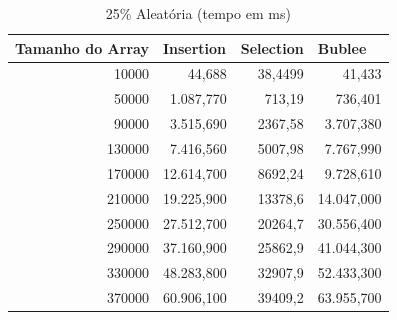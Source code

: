 \documentclass[a4paper, 12pt]{article}
\begin{document}
\begin{longtable}[c]{rrrr}
	\caption{25\% Aleatória (tempo em ms)}
	\label{tab:aleatoria251-table}\\
	\hline
	\multicolumn{1}{l}{\textbf{Tamanho do Array}} & \multicolumn{1}{l}{\textbf{Insertion}} & \multicolumn{1}{l}{\textbf{Selection}} & \multicolumn{1}{l}{\textbf{Bublee}} \\ \hline
	\endfirsthead
	\endhead
	\multicolumn{1}{|r|}{10000}                   & \multicolumn{1}{r|}{44,688}            & \multicolumn{1}{r|}{38,4499}           & \multicolumn{1}{r|}{41,433}         \\ \hline
	\multicolumn{1}{|r|}{50000}                   & \multicolumn{1}{r|}{1.087,770}         & \multicolumn{1}{r|}{713,19}            & \multicolumn{1}{r|}{736,401}        \\ \hline
	\multicolumn{1}{|r|}{90000}                   & \multicolumn{1}{r|}{3.515,690}         & \multicolumn{1}{r|}{2367,58}           & \multicolumn{1}{r|}{3.707,380}      \\ \hline
	\multicolumn{1}{|r|}{130000}                  & \multicolumn{1}{r|}{7.416,560}         & \multicolumn{1}{r|}{5007,98}           & \multicolumn{1}{r|}{7.767,990}      \\ \hline
	\multicolumn{1}{|r|}{170000}                  & \multicolumn{1}{r|}{12.614,700}        & \multicolumn{1}{r|}{8692,24}           & \multicolumn{1}{r|}{9.728,610}      \\ \hline
	\multicolumn{1}{|r|}{210000}                  & \multicolumn{1}{r|}{19.225,900}        & \multicolumn{1}{r|}{13378,6}           & \multicolumn{1}{r|}{14.047,000}     \\ \hline
	\multicolumn{1}{|r|}{250000}                  & \multicolumn{1}{r|}{27.512,700}        & \multicolumn{1}{r|}{20264,7}           & \multicolumn{1}{r|}{30.556,400}     \\ \hline
	\multicolumn{1}{|r|}{290000}                  & \multicolumn{1}{r|}{37.160,900}        & \multicolumn{1}{r|}{25862,9}           & \multicolumn{1}{r|}{41.044,300}     \\ \hline
	\multicolumn{1}{|r|}{330000}                  & \multicolumn{1}{r|}{48.283,800}        & \multicolumn{1}{r|}{32907,9}           & \multicolumn{1}{r|}{52.433,300}     \\ \hline
	\multicolumn{1}{|r|}{370000}                  & \multicolumn{1}{r|}{60.906,100}        & \multicolumn{1}{r|}{39409,2}           & \multicolumn{1}{r|}{63.955,700}     \\ \hline

\end{longtable}
\end{document}
